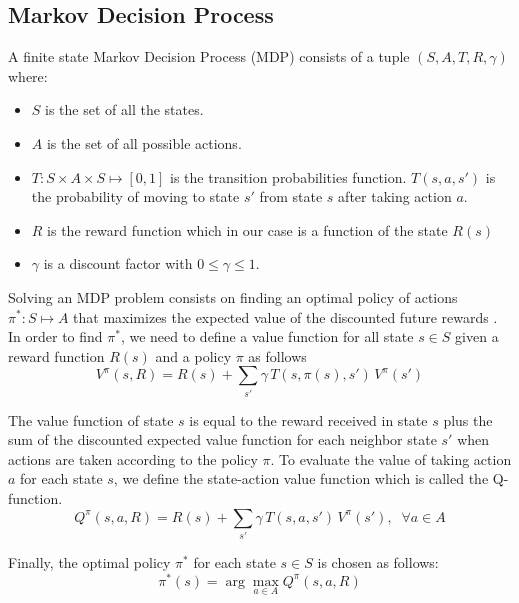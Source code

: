 \documentclass[letterpaper, 10 pt, conference]{ieeeconf}  %
\newcommand\NB[1]{$\spadesuit$\footnote{NB: #1}}
\begin{document}
\subsection{Markov Decision Process}
A finite state Markov Decision Process (MDP) \cite{puterman2014markov} consists of a tuple $(S,A,T,R,\gamma)$ where:
\begin{itemize}
    \item $S$ is the set of all the states.
    \item $A$ is the set of all possible actions.
    \item $T : S\times A\times S \mapsto [0,1]$ is the transition probabilities function. $T(s,a,s')$ is the probability of moving to state $s'$ from state $s$ after taking action $a$.
    \item $R$ is the reward function which in our case is a function of the state $R(s)$
    \item $\gamma$ is a discount factor with $0\leq\gamma\leq1$.
\end{itemize}
Solving an MDP problem consists on finding an optimal policy of actions $\pi^*: S \mapsto A$ that maximizes the expected value of the discounted future rewards \cite{bezzo2016stochastic}.
In order to find $\pi^*$, we need to define a value function for all state $s \in S$ given a reward function $R(s)$ and a policy $\pi$ as follows 
\begin{equation}
V^\pi(s,R) = R(s) + \sum_{s'}\gamma\,T(s,\pi(s),s')\,V^\pi(s') 
\end{equation}

The value function of state $s$ is equal to the reward received in state $s$ plus the sum of the discounted expected value function for each neighbor state $s'$ when actions are taken according to the policy $\pi$.
To evaluate the value of taking action $a$ for each state $s$, we define the state-action value function which is called the Q-function.
\begin{equation}
Q^\pi(s,a,R) = R(s) + \sum_{s'} \gamma\,T(s,a,s')\,V^\pi(s'), \;\; \forall a \in A
\end{equation}

Finally, the optimal policy $\pi^*$ for each state $s \in S$ is chosen as follows:
\begin{equation}
\pi^*(s) = \arg\!\max_{a\in A} Q^\pi(s,a,R)
\end{equation}
\end{document}
